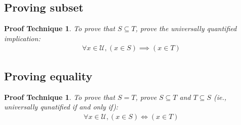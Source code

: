 \documentclass[10pt]{article}
\theoremstyle{break}
\newtheorem{pt}[thm]{Proof Technique}
\begin{document}
\subsection{Proving subset}
\begin{pt}
    To prove that $S \subseteq T$, prove the universally quantified implication: 
    \begin{align*}
        \forall x \in \mathcal{U}, (x \in S) \implies (x \in T)
    \end{align*}
\end{pt}
\subsection{Proving equality}
\begin{pt}
    To prove that $S = T$, prove $S \subseteq T$ and $T \subseteq S$ (ie., universally qunatified if and only if): 
    \begin{align*}
        \forall x \in \mathcal{U}, (x \in S) \iff (x \in T)
    \end{align*}
\end{pt}
\end{document}
